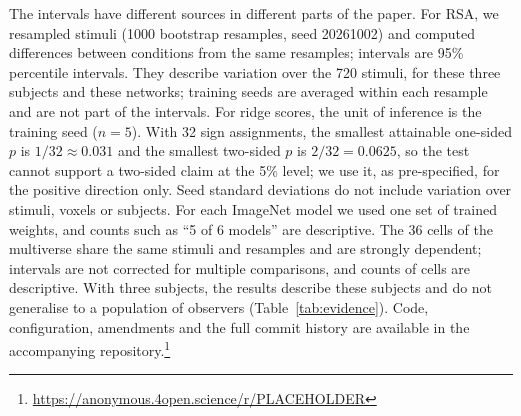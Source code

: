 The intervals have different sources in different parts of the paper. For RSA, we resampled stimuli (1000 bootstrap resamples, seed 20261002) and computed differences between conditions from the same resamples; intervals are 95\% percentile intervals. They describe variation over the 720 stimuli, for these three subjects and these networks; training seeds are averaged within each resample and are not part of the intervals. For ridge scores, the unit of inference is the training seed ($n = 5$). With 32 sign assignments, the smallest attainable one-sided $p$ is $1/32 \approx 0.031$ and the smallest two-sided $p$ is $2/32 = 0.0625$, so the test cannot support a two-sided claim at the 5\% level; we use it, as pre-specified, for the positive direction only. Seed standard deviations do not include variation over stimuli, voxels or subjects. For each ImageNet model we used one set of trained weights, and counts such as ``5 of 6 models'' are descriptive. The 36 cells of the multiverse share the same stimuli and resamples and are strongly dependent; intervals are not corrected for multiple comparisons, and counts of cells are descriptive. With three subjects, the results describe these subjects and do not generalise to a population of observers (Table~\ref{tab:evidence}). Code, configuration, amendments and the full commit history are available in the accompanying repository.\footnote{\url{https://anonymous.4open.science/r/PLACEHOLDER}}
